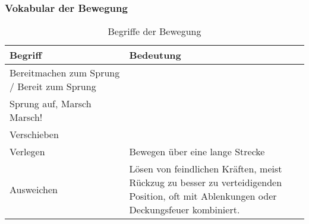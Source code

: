 \subsubsection{Vokabular der Bewegung}
	\begin{longtable}{|p{0.4\linewidth} | p{0.6\linewidth} |}
		\caption[Vokabular Bewegung]{Begriffe der Bewegung} \\
		\hline
		\textbf{Begriff} & \textbf{Bedeutung} \\
		\hline
		Bereitmachen zum Sprung / Bereit zum Sprung & \\
		\hline
		Sprung auf, Marsch Marsch! & \\
		\hline
		Verschieben & \\
		\hline
		Verlegen & Bewegen über eine lange Strecke \\
		\hline
		Ausweichen & Lösen von feindlichen Kräften, meist Rückzug zu besser zu verteidigenden Position, oft mit Ablenkungen oder Deckungsfeuer kombiniert.\\
		\hline
	\end{longtable}